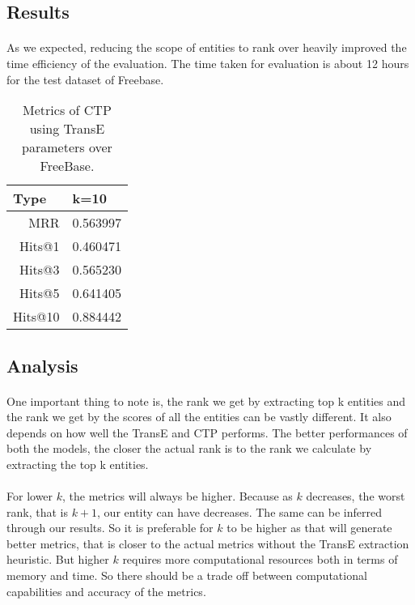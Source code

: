 \documentclass[Other]{iitddiss}
\begin{document}
\subsection{Results}
\paragraph{}
As we expected, reducing the scope of entities to rank over heavily improved the time efficiency of the evaluation. The time taken for evaluation is about 12 hours for the test dataset of Freebase.

\begin{table}[H]
	\centering
	\begin{tabular}{|r|r|}
		\hline
		\multicolumn{1}{|l|}{\textbf{Type}} & \multicolumn{1}{l|}{\textbf{k=10}}  \\ \hline
		MRR                                    & 0.563997      	                                \\ \hline
		Hits@1                                    & 0.460471		                                   \\ \hline
		Hits@3                                    & 0.565230		                                    \\ \hline
		Hits@5                                    & 0.641405		                                     \\ \hline
		Hits@10                                    & 0.884442	                                    \\ \hline
	\end{tabular}
	\caption{Metrics of CTP using TransE parameters over FreeBase. }
	\label{tab:transE_MRR}
\end{table}

\subsection{Analysis}

\paragraph{}
One important thing to note is, the rank we get by extracting top k entities and the rank we get by the scores of all the entities can be vastly different. It also depends on how well the TransE and CTP performs. The better performances of both the models, the closer the actual rank is to the rank we calculate by extracting the top k entities. 

\paragraph{}
For lower \(k\), the metrics will always be higher. Because as \(k\) decreases, the worst rank, that is \(k+1\), our entity can have decreases. The same can be inferred through our results. So it is preferable for \(k\) to be higher as that will generate better metrics, that is closer to the actual metrics without the TransE extraction heuristic. But higher \(k\) requires more computational resources both in terms of memory and time. So there should be a trade off between computational capabilities and accuracy of the metrics.
\end{document}
